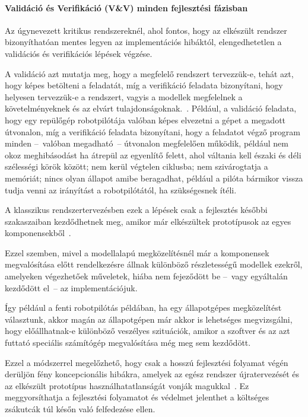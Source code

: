        \paragraph{Validáció és Verifikáció (V\&V) minden fejlesztési fázisban}
        Az úgynevezett kritikus rendszereknél, ahol fontos, hogy az elkészült rendszer bizonyíthatóan mentes legyen az implementációs hibáktól, elengedhetetlen a validációs és verifikációs lépések végzése.
        
        A validáció azt mutatja meg, hogy a megfelelő rendszert tervezzük-e, tehát azt, hogy képes betölteni a feladatát, míg a verifikáció feladata bizonyítani, hogy helyesen tervezzük-e a rendszert, vagyis a modellek megfelelnek a követelményeknek és az elvárt tulajdonságoknak.~\cite{Gianni2017}.
        Például, a validáció feladata, hogy egy repülőgép robotpilótája valóban képes elvezetni a gépet a megadott útvonalon, míg a verifikáció feladata bizonyítani, hogy a feladatot végző program minden --~valóban megadható~-- útvonalon megfelelően működik, például nem okoz meghibásodást ha átrepül az egyenlítő felett, ahol váltania kell északi és déli szélességi körök között; nem kerül végtelen ciklusba; nem szivárogtatja a memóriát; nincs olyan állapot amibe beragadhat, például a pilóta bármikor vissza tudja venni az irányítást a robotpilótától, ha szükségesnek ítéli.
        
        A klasszikus rendszertervezésben ezek a lépések csak a fejlesztés későbbi szakaszaiban kezdődhetnek meg, amikor már elkészültek prototípusok az egyes komponensekből~\cite{Bajaj_2022}.
        
        Ezzel szemben, mivel a modellalapú megközelítésnél már a komponensek megvalósítása előtt rendelkezésre állnak különböző részletességű modellek ezekről, amelyeken végezhetőek műveletek, hiába nem fejeződött be --~vagy egyáltalán kezdődött el~-- az implementációjuk.
        
        Így például a fenti robotpilótás példában, ha egy állapotgépes megközelítést választunk, akkor magán az állapotgépen már akkor is lehetséges megvizsgálni, hogy előállhatnak-e különböző veszélyes szituációk, amikor a szoftver és az azt futtató speciális számítógép megvalósítása még meg sem kezdődött.
        
        Ezzel a módszerrel megelőzhető, hogy csak a hosszú fejlesztési folyamat végén derüljön fény koncepcionális hibákra, amelyek az egész rendszer újratervezését és az elkészült prototípus használhatatlanságát vonják magukkal~\cite{Gianni2017}.
        Ez meggyorsíthatja a fejlesztési folyamatot és védelmet jelenthet a költséges zsákutcák túl későn való felfedezése ellen.
        
